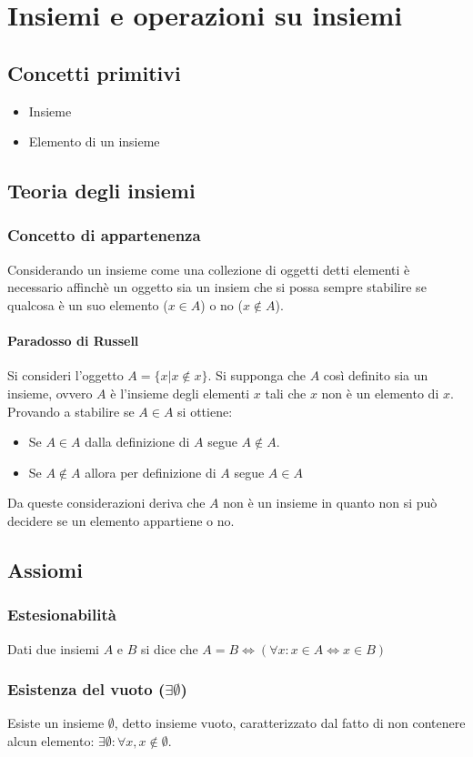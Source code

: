 \chapter{Insiemi e operazioni su insiemi}
\section{Concetti primitivi}
\begin{itemize}
\item Insieme
\item Elemento di un insieme
\end{itemize}
\section{Teoria degli insiemi}
\subsection{Concetto di appartenenza}
Considerando un insieme come una collezione di oggetti detti elementi \`e necessario affinch\`e un oggetto sia un insiem che si possa sempre stabilire se qualcosa \`e un suo elemento
($x\in A$) o no ($x\not\in A$). 
\subsubsection{Paradosso di Russell}
Si consideri l'oggetto $A=\{x|x\not\in x\}$. Si supponga che $A$ cos\`i definito sia un insieme, ovvero $A$ \`e l'insieme degli elementi $x$ tali che $x$ non \`e un elemento di $x$. Provando a stabilire se $A\in A$ si ottiene:
\begin{itemize}
\item Se $A\in A$ dalla definizione di $A$ segue $A\not\in A$.
\item Se $A\not\in A$ allora per definizione di $A$ segue $A\in A$ 
\end{itemize}
Da queste considerazioni deriva che $A$ non \`e un insieme in quanto non si pu\`o decidere se un elemento appartiene o no. 
\section{Assiomi}
\subsection{Estesionabilit\`a}
Dati due insiemi $A$ e $B$ si dice che $A=B\Leftrightarrow(\forall x: x\in A\Leftrightarrow x\in B)$
\subsection{Esistenza del vuoto ($\mathbf{\exists\emptyset}$)}
Esiste un insieme $\emptyset$, detto insieme vuoto, caratterizzato dal fatto di non contenere alcun elemento: $\exists\emptyset: \forall x, x\not\in\emptyset$.
